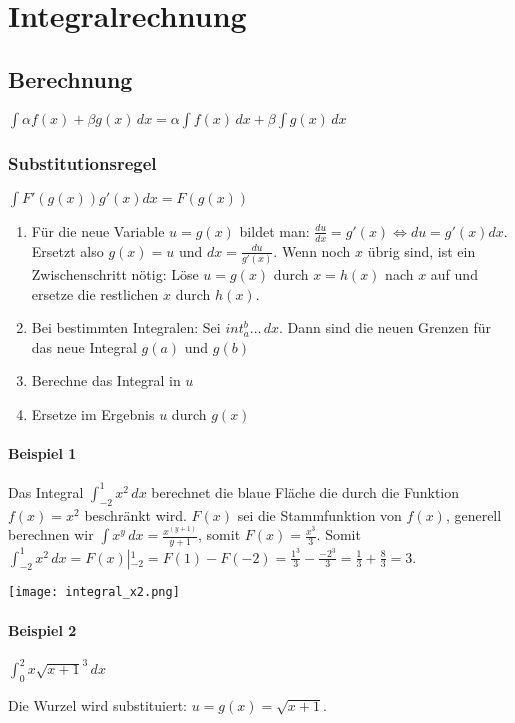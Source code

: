 \section{Integralrechnung}
\subsection{Berechnung}
$\int \alpha f(x) + \beta g(x)\,dx = \alpha \int f(x)\,dx + \beta \int g(x)\,dx$

\subsubsection{Substitutionsregel}
$\int F'(g(x)) g'(x)dx = F(g(x))$


\begin{enumerate}
	\item Für die neue Variable $u = g(x)$ bildet man: $\frac{du}{dx} = g'(x)
	\Leftrightarrow du = g'(x)dx$. Ersetzt also $g(x) = u$ und $dx =
	\frac{du}{g'(x)}$. Wenn noch $x$ übrig sind, ist ein Zwischenschritt nötig:
	Löse $u = g(x)$ durch $x = h(x)$ nach $x$ auf und ersetze die restlichen $x$
	durch $h(x)$.
	\item Bei bestimmten Integralen: Sei $int_a^b \ldots \,dx$. Dann sind die neuen
	Grenzen für das neue Integral $g(a)$ und $g(b)$
	\item Berechne das Integral in $u$
	\item Ersetze im Ergebnis $u$ durch $g(x)$
\end{enumerate}

\paragraph{Beispiel 1}
Das Integral $\int_{-2}^1 x^2 \,dx$ berechnet die blaue Fläche die durch die Funktion $f(x) = x^2$ beschränkt wird.
$F(x)$ sei die Stammfunktion von $f(x)$,  generell berechnen wir $\int x^y \,dx = \frac{x^{(y+1)}}{y+1}$, somit $F(x) = \frac{x^3}{3}$.
Somit $\int_{-2}^1 x^2 \,dx = F(x) \left |_{-2}^1 \right. = F(1) - F(-2) =  \frac{1^3}{3} -  \frac{-2^3}{3} = \frac{1}{3} +  \frac{8}{3} = 3.$

\texttt{[image: integral\_x2.png]}

\paragraph{Beispiel 2}
$\int_0^2 x \sqrt{x+1}^3 \,dx$

Die Wurzel wird substituiert: $u = g(x) = \sqrt{x+1}$.

